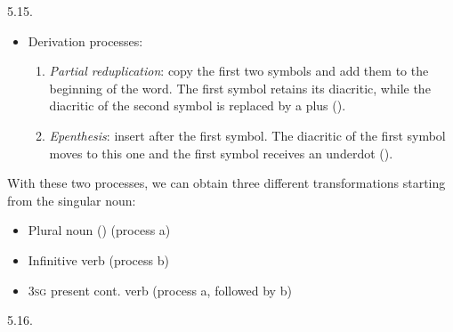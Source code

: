 \begin{refsection}
\begin{practiceproblemsolution}{5.15. \langnameIlocano}
\begin{itemize}
\begin{itemize}
    \end{itemize}
    \item Derivation processes:
    \begin{enumerate}[label = \alph*.]

        \item \emph{Partial reduplication}: copy the first two symbols and add them to the beginning of the word. The first symbol retains its diacritic, while the diacritic of the second symbol is replaced by a plus ().
        \item \emph{Epenthesis}: insert  after the first symbol. The diacritic of the first symbol moves to this one and the first symbol receives an underdot ().
    \end{enumerate}
\end{itemize}

 With these two processes, we can obtain three different transformations starting from the singular noun:

\begin{itemize}
    \item Plural noun () (process a)
    \item Infinitive verb (process b)
    \item 3\textsc{sg} present cont. verb (process a, followed by b)
\end{itemize}



\end{practiceproblemsolution}
\begin{practiceproblemsolution}{5.16. \langnameIrish}


\end{practiceproblemsolution}
\end{refsection}
